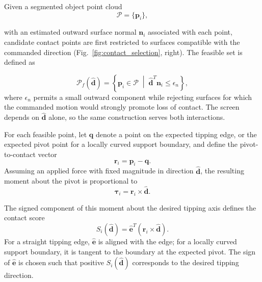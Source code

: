\documentclass[10pt, conference]{IEEEtran}
\begin{document}
Given a segmented object point cloud
\begin{equation}
    \mathcal{P} = \{\mathbf p_i\},
\end{equation}

with an estimated outward surface normal $\mathbf n_i$ associated with each point, candidate contact points are first restricted to surfaces compatible with the commanded direction (Fig.~\ref{fig:contact_selection}, right). The feasible set is defined as

\begin{equation}
    \mathcal{P}_f(\hat{\mathbf d}) =
    \left\{
    \mathbf p_i \in \mathcal{P}
    \;\middle|\;
    \hat{\mathbf d}^{T}\mathbf n_i \leq \epsilon_n
    \right\},
    \label{eq:press_feasible_set}
\end{equation}
where $\epsilon_n$ permits a small outward component while rejecting surfaces for which the commanded motion would strongly promote loss of contact. The screen depends on $\hat{\mathbf d}$ alone, so the same construction serves both interactions.

For each feasible point, let $\mathbf q$ denote a point on the expected tipping edge, or the expected pivot point for a locally curved support boundary, and define the pivot-to-contact vector
\begin{equation}
    \mathbf r_i = \mathbf p_i - \mathbf q.
\end{equation}
Assuming an applied force with fixed magnitude in direction $\hat{\mathbf d}$, the resulting moment about the pivot is proportional to
\begin{equation}
    \boldsymbol{\tau}_i
    =
    \mathbf r_i \times \hat{\mathbf d}.
    \label{eq:press_point_torque}
\end{equation}

The signed component of this moment about the desired tipping axis defines the contact score
\begin{equation}
    S_i(\hat{\mathbf d})
    =
    \hat{\mathbf e}^{T}
    \left(
    \mathbf r_i \times \hat{\mathbf d}
    \right).
    \label{eq:score}
\end{equation}
For a straight tipping edge, $\hat{\mathbf e}$ is aligned with the edge; for a locally curved support boundary, it is tangent to the boundary at the expected pivot. The sign of $\hat{\mathbf e}$ is chosen such that positive $S_i(\hat{\mathbf d})$ corresponds to the desired tipping direction.
\end{document}
